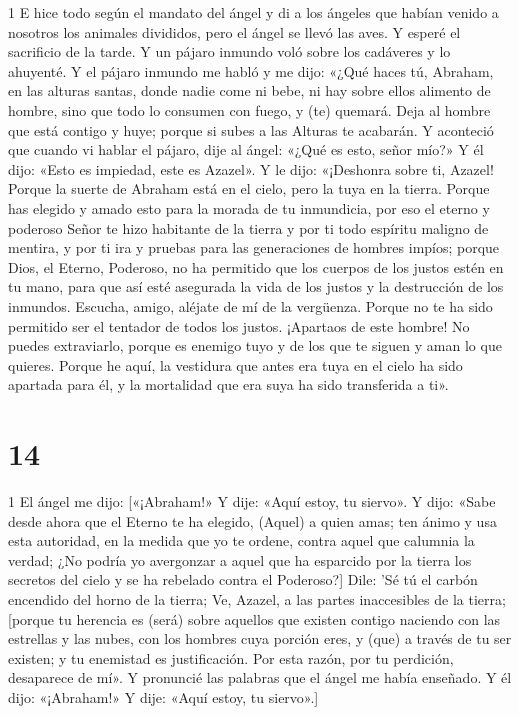 \par 1 E hice todo según el mandato del ángel y di a los ángeles que habían venido a nosotros los animales divididos, pero el ángel se llevó las aves. Y esperé el sacrificio de la tarde. Y un pájaro inmundo voló sobre los cadáveres y lo ahuyenté. Y el pájaro inmundo me habló y me dijo: «¿Qué haces tú, Abraham, en las alturas santas, donde nadie come ni bebe, ni hay sobre ellos alimento de hombre, sino que todo lo consumen con fuego, y (te) quemará. Deja al hombre que está contigo y huye; porque si subes a las Alturas te acabarán. Y aconteció que cuando vi hablar el pájaro, dije al ángel: «¿Qué es esto, señor mío?» Y él dijo: «Esto es impiedad, este es Azazel». Y le dijo: «¡Deshonra sobre ti, Azazel! Porque la suerte de Abraham está en el cielo, pero la tuya en la tierra. Porque has elegido y amado esto para la morada de tu inmundicia, por eso el eterno y poderoso Señor te hizo habitante de la tierra y por ti todo espíritu maligno de mentira, y por ti ira y pruebas para las generaciones de hombres impíos; porque Dios, el Eterno, Poderoso, no ha permitido que los cuerpos de los justos estén en tu mano, para que así esté asegurada la vida de los justos y la destrucción de los inmundos. Escucha, amigo, aléjate de mí de la vergüenza. Porque no te ha sido permitido ser el tentador de todos los justos. ¡Apartaos de este hombre! No puedes extraviarlo, porque es enemigo tuyo y de los que te siguen y aman lo que quieres. Porque he aquí, la vestidura que antes era tuya en el cielo ha sido apartada para él, y la mortalidad que era suya ha sido transferida a ti».

\chapter{14}

\par 1 El ángel me dijo: [«¡Abraham!» Y dije: «Aquí estoy, tu siervo». Y dijo: «Sabe desde ahora que el Eterno te ha elegido, (Aquel) a quien amas; ten ánimo y usa esta autoridad, en la medida que yo te ordene, contra aquel que calumnia la verdad; ¿No podría yo avergonzar a aquel que ha esparcido por la tierra los secretos del cielo y se ha rebelado contra el Poderoso?] Dile: 'Sé tú el carbón encendido del horno de la tierra; Ve, Azazel, a las partes inaccesibles de la tierra; [porque tu herencia es (será) sobre aquellos que existen contigo naciendo con las estrellas y las nubes, con los hombres cuya porción eres, y (que) a través de tu ser existen; y tu enemistad es justificación. Por esta razón, por tu perdición, desaparece de mí». Y pronuncié las palabras que el ángel me había enseñado. Y él dijo: «¡Abraham!» Y dije: «Aquí estoy, tu siervo».]

